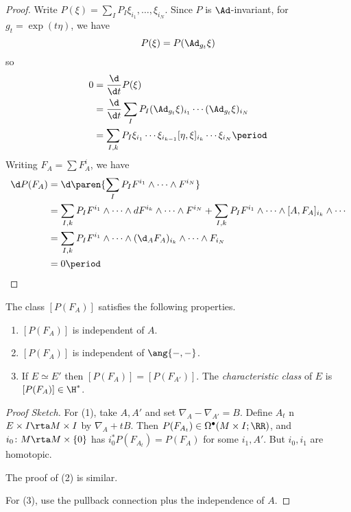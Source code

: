 \begin{proof}
Write $P(\xi)=\sum_I P_I\xi_{i_1},\dots,\xi_{i_N}$. 
Since $P$ is $\Ad$-invariant, for $g_t=\exp(t\eta)$, we have
		\[
			P(\xi)=P(\Ad_{g_t}\xi)
		\]
		so
		\begin{align*}
			0&=\frac{\d}{\d t}P(\xi)\\
			&=\frac{\d}{\d t}\sum_I P_I(\Ad_{g_t}\xi)_{i_1}\cdots(\Ad_{g_t}\xi)_{i_N}\\
			&=\sum_{I,k}P_I\xi_{i_1}\cdots\xi_{i_{k-1}}[\eta,\xi]_{i_k}\cdots\xi_{i_N} \period
		\end{align*}
Writing $F_A=\sum F_A^i$, we have
		\begin{align*}
			\d P(F_A)&=\d\paren{\sum_IP_IF^{i_1}\wedge\cdots\wedge F^{i_N}} \\
			&=\sum_{I,k}P_IF^{i_1}\wedge\cdots \wedge dF^{i_k}\wedge\cdots \wedge F^{i_N}+\sum_{I,k}P_IF^{i_1}\wedge\cdots\wedge [A,F_A]_{i_k} \wedge\cdots\\
			&=\sum_{I,k}P_IF^{i_1}\wedge\cdots\wedge (\d_{A}F_A)_{i_k}\wedge\cdots\wedge F_{i_N}\\
			&=0 \period \qedhere
		\end{align*}
\end{proof}

\begin{prop}[(invariance)]
	The class $[P(F_A)]$ satisfies the following properties.
	\begin{enumerate}[{\upshape (1)}]
		\item $[P(F_A)]$ is independent of $A$.

		\item $[P(F_A)]$ is independent of $\ang{-,-}$.

		\item If $E\simeq E'$ then $[P(F_A)]=[P(F_{A'})]$. 
		The \emph{characteristic class} of $E$ is $[P(F_A)]\in \H^*$.
	\end{enumerate}
\end{prop}

\begin{proof}[Proof Sketch]
For (1), take $A,A'$ and set $\nabla_A-\nabla_{A'}=B$. Define $A_t$ n $E\times I\rta M\times I$ by $\nabla_A+tB$. Then $P(F_{A_t})\in\Omega^\bullet(M\times I;\RR)$, and $i_0\colon M\rta M\times\{0\}$ has $i_0^*P(F_{A_t})=P(F_A)$ for some $i_1,A'$. But $i_0,i_1$ are homotopic.

The proof of (2) is similar. 

For (3), use the pullback connection plus the independence of $A$.
\end{proof}

